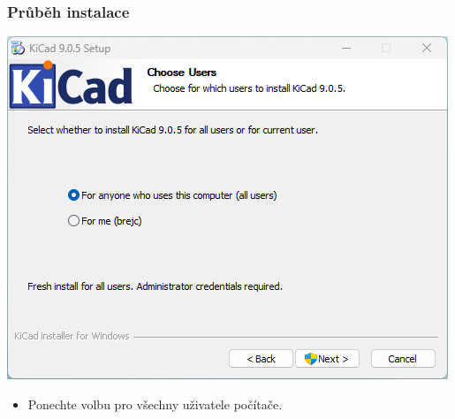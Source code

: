 \documentclass{beamer}
\begin{document}
	\begin{frame}
    \frametitle{Průběh instalace}
		\begin{center}
			\includegraphics[scale=0.5]{obr/kicad_inst2.png}
		\end{center}
		
		\begin{itemize}
			\item Ponechte volbu pro všechny uživatele počítače.
		\end{itemize}
	\end{frame}
\end{document}
